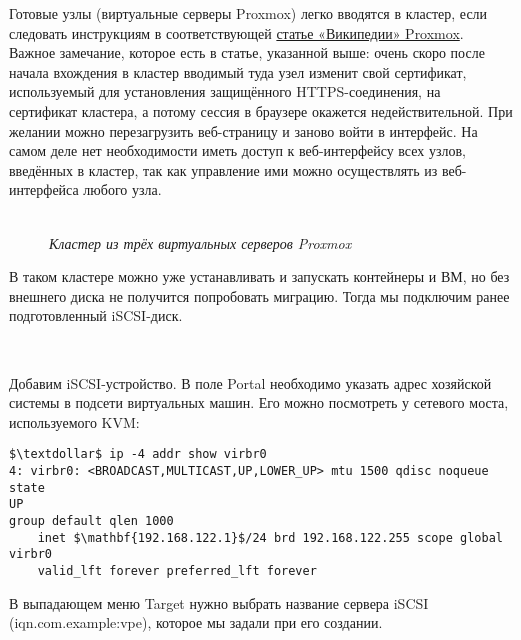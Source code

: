 \documentclass[14pt, a4paper]{article}
\begin{document}
Готовые узлы (виртуальные серверы Proxmox) легко вводятся в кластер, если следовать инструкциям
в соответствующей \href{https://pve.proxmox.com/wiki/Cluster_Manager#pvecm_join_node_to_cluster}{статье «Википедии» Proxmox}.\\

Важное замечание, которое есть в статье, указанной выше: очень скоро после начала вхождения в
кластер вводимый туда узел изменит свой сертификат, используемый для установления защищённого
HTTPS-соединения, на сертификат кластера, а потому сессия в браузере окажется недействительной.
При желании можно перезагрузить веб-страницу и заново войти в интерфейс. На самом деле нет
необходимости иметь доступ к веб-интерфейсу всех узлов, введённых в кластер, так как управление
ими можно осуществлять из веб-интерфейса любого узла.\\


\begin{figure}[h]
    \centering
    \\
    \small\textit{Кластер из трёх виртуальных серверов Proxmox}  
    \label{framework} 
\end{figure}

В таком кластере можно уже устанавливать и запускать контейнеры и ВМ, но без внешнего диска не
получится попробовать миграцию. Тогда мы подключим ранее подготовленный iSCSI-диск.
\newpage
\begin{figure}[h]
    \centering
    \\
    \label{framework} 
\end{figure}


Добавим iSCSI-устройство. В поле Portal необходимо указать адрес хозяйской системы в подсети
виртуальных машин. Его можно посмотреть у сетевого моста, используемого KVM:
\vspace{0.3cm}
\begin{lstlisting}
$\textdollar$ ip -4 addr show virbr0
4: virbr0: <BROADCAST,MULTICAST,UP,LOWER_UP> mtu 1500 qdisc noqueue state 
UP
group default qlen 1000
    inet $\mathbf{192.168.122.1}$/24 brd 192.168.122.255 scope global virbr0
    valid_lft forever preferred_lft forever
\end{lstlisting}
\vspace{0.2cm}

В выпадающем меню Target нужно выбрать название сервера iSCSI (iqn.com.example:vpe), которое мы
задали при его создании.
\end{document}
